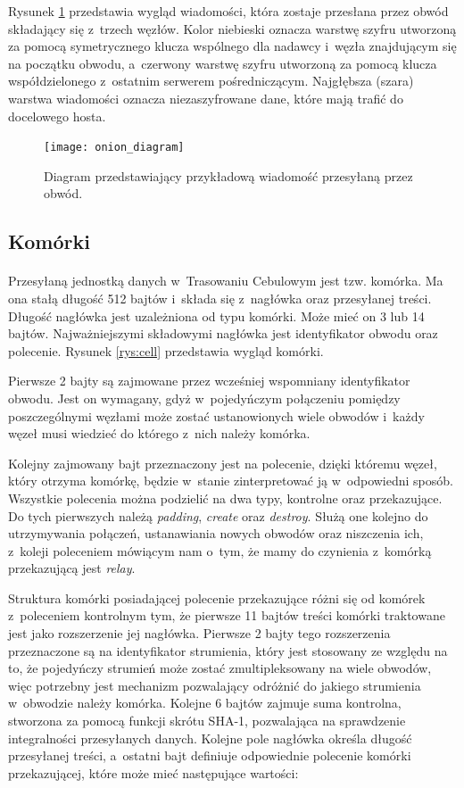 Rysunek \ref{rys:onion_diagram} przedstawia wygląd wiadomości, która zostaje przesłana przez obwód składający się z~trzech węzłów. Kolor niebieski oznacza warstwę szyfru utworzoną za pomocą symetrycznego klucza wspólnego dla nadawcy i~węzła znajdującym się na początku obwodu, a~czerwony warstwę szyfru utworzoną za pomocą klucza współdzielonego z~ostatnim serwerem pośredniczącym. Najgłębsza (szara) warstwa wiadomości oznacza niezaszyfrowane dane, które mają trafić do docelowego hosta.
\begin{figure}
 \centering
 \texttt{[image: onion\_diagram]}
 \caption[Caption for LOF]{Diagram przedstawiający przykładową wiadomość przesyłaną przez obwód\footnotemark.}
 \label{rys:onion_diagram}
\end{figure}

\subsection{Komórki}\paragraph{}
Przesyłaną jednostką danych w~Trasowaniu Cebulowym jest tzw. komórka. Ma ona stałą długość 512 bajtów i~składa się z~nagłówka oraz przesyłanej treści. Długość nagłówka jest uzależniona od typu komórki. Może mieć on 3 lub 14 bajtów. Najważniejszymi składowymi nagłówka jest identyfikator obwodu oraz polecenie. Rysunek \ref{rys:cell} przedstawia wygląd komórki.

Pierwsze 2 bajty są zajmowane przez wcześniej wspomniany identyfikator obwodu. Jest on wymagany, gdyż w~pojedyńczym połączeniu pomiędzy poszczególnymi węzłami może zostać ustanowionych wiele obwodów i~każdy węzeł musi wiedzieć do którego z~nich należy komórka.

Kolejny zajmowany bajt przeznaczony jest na polecenie, dzięki któremu węzeł, który otrzyma komórkę, będzie w~stanie zinterpretować ją w~odpowiedni sposób. Wszystkie polecenia można podzielić na dwa typy, kontrolne oraz przekazujące. Do tych pierwszych należą \textit{padding}, \textit{create} oraz \textit{destroy}. Służą one kolejno do utrzymywania połączeń, ustanawiania nowych obwodów oraz niszczenia ich, z~koleji poleceniem mówiącym nam o~tym, że mamy do czynienia z~komórką przekazującą jest \textit{relay}.

Struktura komórki posiadającej polecenie przekazujące różni się od komórek z~poleceniem kontrolnym tym, że pierwsze 11 bajtów treści komórki traktowane jest jako rozszerzenie jej nagłówka. Pierwsze 2 bajty tego rozszerzenia przeznaczone są na identyfikator strumienia, który jest stosowany ze względu na to, że pojedyńczy strumień może zostać zmultipleksowany na wiele obwodów, więc potrzebny jest mechanizm pozwalający odróżnić do jakiego strumienia w~obwodzie należy komórka. Kolejne 6 bajtów zajmuje suma kontrolna, stworzona za pomocą funkcji skrótu SHA-1, pozwalająca na sprawdzenie integralności przesyłanych danych. Kolejne pole nagłówka określa długość przesyłanej treści, a~ostatni bajt definiuje odpowiednie polecenie komórki przekazującej, które może mieć następujące wartości:

